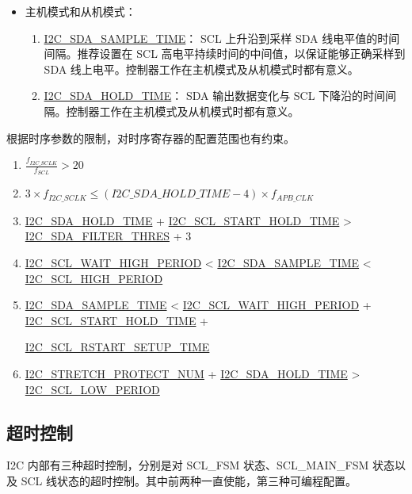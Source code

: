 \documentclass[main\_\_CN.tex]{subfiles}
\begin{document}
\begin{itemize}
\item 主机模式和从机模式：

\begin{enumerate}

\item \hyperref[fielddesc:I2CSDASAMPLETIME]{I2C\_SDA\_SAMPLE\_TIME}：
SCL 上升沿到采样 SDA 线电平值的时间间隔。推荐设置在 SCL 高电平持续时间的中间值，以保证能够正确采样到 SDA 线上电平。控制器工作在主机模式及从机模式时都有意义。

\item \hyperref[fielddesc:I2CSDAHOLDTIME]{I2C\_SDA\_HOLD\_TIME}：
SDA 输出数据变化与 SCL 下降沿的时间间隔。控制器工作在主机模式及从机模式时都有意义。

\end{enumerate}

\end{itemize}

根据时序参数的限制，对时序寄存器的配置范围也有约束。
\begin{enumerate}
\item $\frac{f_{I2C\_SCLK}}{f_{SCL}} > 20$
\item $3 \times f_{I2C\_SCLK} \leq (\hyperref[fielddesc:I2CSDAHOLDTIME]{I2C\_SDA\_HOLD\_TIME}-4) \times f_{APB\_CLK}$
\item \hyperref[fielddesc:I2CSDAHOLDTIME]{I2C\_SDA\_HOLD\_TIME} + \hyperref[fielddesc:I2CSCLSTARTHOLDTIME]{I2C\_SCL\_START\_HOLD\_TIME} > \hyperref[fielddesc:I2CSDAFILTERTHRES]{I2C\_SDA\_FILTER\_THRES} + 3
\item \hyperref[fielddesc:I2CSCLWAITHIGHPERIOD]{I2C\_SCL\_WAIT\_HIGH\_PERIOD} < \hyperref[fielddesc:I2CSDASAMPLETIME]{I2C\_SDA\_SAMPLE\_TIME} < \hyperref[fielddesc:I2CSCLHIGHPERIOD]{I2C\_SCL\_HIGH\_PERIOD}
\item \hyperref[fielddesc:I2CSDASAMPLETIME]{I2C\_SDA\_SAMPLE\_TIME} < \hyperref[fielddesc:I2CSCLWAITHIGHPERIOD]{I2C\_SCL\_WAIT\_HIGH\_PERIOD} + \hyperref[fielddesc:I2CSCLSTARTHOLDTIME]{I2C\_SCL\_START\_HOLD\_TIME} +

\hyperref[fielddesc:I2CSCLRSTARTSETUPTIME]{I2C\_SCL\_RSTART\_SETUP\_TIME}
\item \hyperref[fielddesc:I2CSTRETCHPROTECTNUM]{I2C\_STRETCH\_PROTECT\_NUM} + \hyperref[fielddesc:I2CSDAHOLDTIME]{I2C\_SDA\_HOLD\_TIME} > \hyperref[fielddesc:I2CSCLLOWPERIOD]{I2C\_SCL\_LOW\_PERIOD}
\end{enumerate}

\subsection{超时控制}
I2C 内部有三种超时控制，分别是对 SCL\_FSM 状态、SCL\_MAIN\_FSM 状态以及 SCL 线状态的超时控制。其中前两种一直使能，第三种可编程配置。
\end{document}
